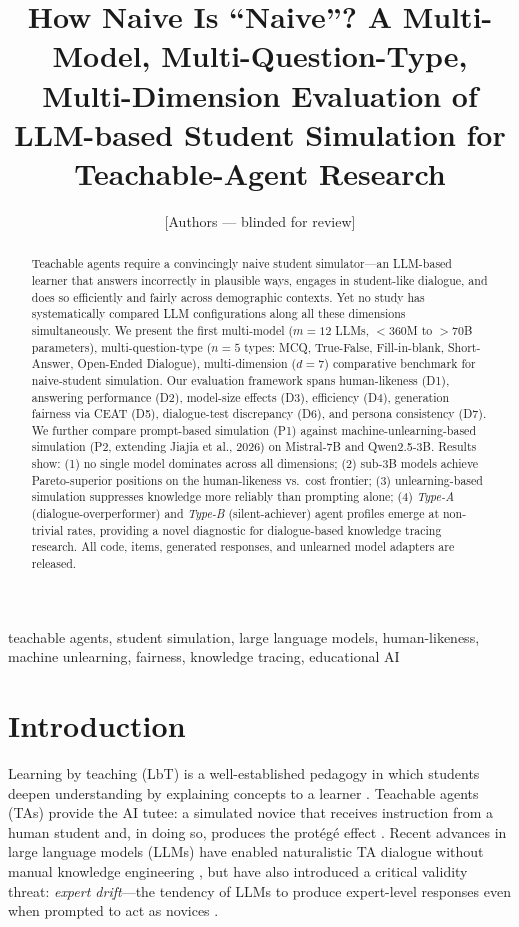 \documentclass[10pt,twocolumn]{IEEEtran}
\title{How Naive Is ``Naive''? A Multi-Model, Multi-Question-Type,
Multi-Dimension Evaluation of LLM-based Student Simulation
for Teachable-Agent Research}
\author{[Authors --- blinded for review]}
\begin{document}
\maketitle

\begin{abstract}
Teachable agents require a convincingly naive student simulator—an LLM-based
learner that answers incorrectly in plausible ways, engages in student-like
dialogue, and does so efficiently and fairly across demographic contexts.
Yet no study has systematically compared LLM configurations along all these
dimensions simultaneously. We present the first multi-model (\(m=12\) LLMs,
\(<\)360M to \(>\)70B parameters), multi-question-type (\(n=5\) types:
MCQ, True-False, Fill-in-blank, Short-Answer, Open-Ended Dialogue),
multi-dimension (\(d=7\)) comparative benchmark for naive-student simulation.
Our evaluation framework spans human-likeness (D1), answering performance (D2),
model-size effects (D3), efficiency (D4), generation fairness via CEAT (D5),
dialogue-test discrepancy (D6), and persona consistency (D7).
We further compare prompt-based simulation (P1) against machine-unlearning-based
simulation (P2, extending Jiajia et al., 2026) on Mistral-7B and Qwen2.5-3B.
Results show: (1) no single model dominates across all dimensions;
(2) sub-3B models achieve Pareto-superior positions on the human-likeness vs.\
cost frontier; (3) unlearning-based simulation suppresses knowledge more reliably
than prompting alone; (4) \textit{Type-A} (dialogue-overperformer) and
\textit{Type-B} (silent-achiever) agent profiles emerge at non-trivial rates,
providing a novel diagnostic for dialogue-based knowledge tracing research.
All code, items, generated responses, and unlearned model adapters are released.
\end{abstract}

\begin{IEEEkeywords}
teachable agents, student simulation, large language models, human-likeness,
machine unlearning, fairness, knowledge tracing, educational AI
\end{IEEEkeywords}

\section{Introduction}

Learning by teaching (LbT) is a well-established pedagogy in which students
deepen understanding by explaining concepts to a learner \cite{biswas2016design,
kobayashi2019learning, fiorella2015learning}. Teachable agents (TAs) provide
the AI tutee: a simulated novice that receives instruction from a human student
and, in doing so, produces the protégé effect \cite{chase2009teachable}. Recent
advances in large language models (LLMs) have enabled naturalistic TA dialogue
without manual knowledge engineering \cite{chen2024learning, ma2024teach}, but
have also introduced a critical validity threat: \textit{expert drift}—the
tendency of LLMs to produce expert-level responses even when prompted to act as
novices \cite{rogers2025playing, benedetto2024using}.
\end{document}
